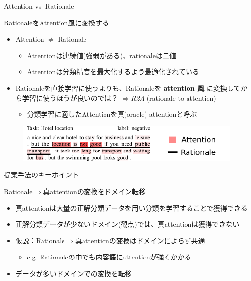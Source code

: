 \begin{frame}{Attention vs. Rationale}
\begin{lead}
    RationaleをAttention風に変換する
\end{lead}
\begin{itemize}
\item Attention $\neq$ Rationale
\begin{itemize}
    \item Attentionは連続値(強弱がある)、rationaleは二値
    \item Attentionは分類精度を最大化するよう最適化されている
\end{itemize}
\item Rationaleを直接学習に使うよりも、Rationaleを \textbf{attention 風} に変換してから学習に使うほうが良いのでは？ $\Rightarrow$\emph{R2A} (rationale to attention)
\begin{itemize}
    \item 分類学習に適したAttentionを\alert{真(oracle) attention}と呼ぶ
\end{itemize}
\end{itemize}
\vspace*{-8pt}
\begin{figure}[H]
\centering
\includegraphics[width=\linewidth]{fig/attention_vs_rationale.pdf}
\end{figure}
\end{frame}

\begin{frame}{提案手法のキーポイント}
\begin{lead}
    Rationale$\Rightarrow$真attentionの変換をドメイン転移
\end{lead}
\begin{itemize}
\item 真attentionは大量の正解分類データを用い分類を学習することで獲得できる
\item 正解分類データが少ないドメイン(観点)では、真attentionは獲得できない
\item 仮説：Rationale$\Rightarrow$真attentionの変換は\alert{ドメインによらず共通}
\begin{itemize}
    \item e.g. Rationaleの中でも内容語にattentionが強くかかる
\end{itemize}
\item データが多いドメインでの変換を転移
\end{itemize}
\end{frame}

